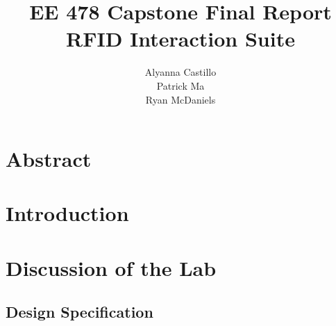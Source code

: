 \documentclass[12pt]{article} %
\title{\TitleFont EE 478 Capstone Final Report \\ RFID Interaction Suite \vfill }
\author{\AuthorFont Alyanna Castillo \\ Patrick Ma \\ Ryan McDaniels}
\date{}
\begin{document}
\maketitle
\thispagestyle{empty}
\pagebreak \tableofcontents
\listoftables
\listoffigures
\thispagestyle{empty}
\pagebreak
\setcounter{page}{1}

\section{Abstract}
% 

\section{Introduction}

\section{Discussion of the Lab}


\subsection{Design Specification}

\end{document}
